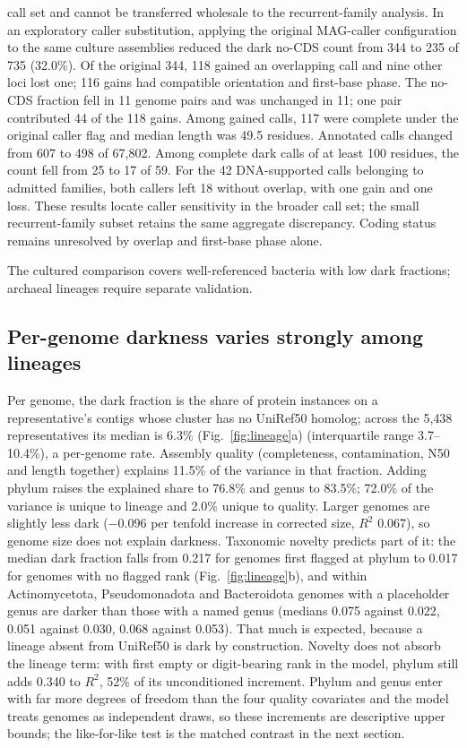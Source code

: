 \documentclass[11pt]{article}
\begin{document}
call set and cannot be transferred wholesale to the recurrent-family analysis.
In an exploratory caller substitution, applying the original MAG-caller configuration to the same culture assemblies reduced the dark no-CDS count from 344 to 235 of 735 (32.0\%). Of the original 344, 118 gained an overlapping call and nine other loci lost one; 116 gains had compatible orientation and first-base phase. The no-CDS fraction fell in 11 genome pairs and was unchanged in 11; one pair contributed 44 of the 118 gains. Among gained calls, 117 were complete under the original caller flag and median length was 49.5 residues. Annotated calls changed from 607 to 498 of 67{,}802. Among complete dark calls of at least 100 residues, the count fell from 25 to 17 of 59. For the 42 DNA-supported calls belonging to admitted families, both callers left 18 without overlap, with one gain and one loss. These results locate caller sensitivity in the broader call set; the small recurrent-family subset retains the same aggregate discrepancy. Coding status remains unresolved by overlap and first-base phase alone.

The cultured comparison covers well-referenced bacteria with low dark
fractions; archaeal lineages require separate validation.

\subsection*{Per-genome darkness varies strongly among lineages}

Per genome, the dark fraction is the share of protein instances on a representative's contigs whose
cluster has no UniRef50 homolog; across the 5{,}438 representatives its median is 6.3\% (Fig.~\ref{fig:lineage}a)
(interquartile range 3.7--10.4\%), a per-genome rate. Assembly quality (completeness, contamination, N50 and length together) explains 11.5\% of the
variance in that fraction. Adding phylum raises the explained share to 76.8\% and genus to 83.5\%;
72.0\% of the variance is unique to lineage and 2.0\% unique to quality.
Larger genomes are slightly less dark ($-0.096$ per tenfold increase in corrected size, $R^2$ 0.067),
so genome size does not explain darkness. Taxonomic novelty predicts part of it: the median dark
fraction falls from 0.217 for genomes first flagged at phylum to 0.017 for genomes with no flagged rank
(Fig.~\ref{fig:lineage}b), and within Actinomycetota, Pseudomonadota and Bacteroidota genomes with a
placeholder genus are darker than those with a named genus (medians 0.075 against 0.022, 0.051
against 0.030, 0.068 against 0.053). That much is expected, because a lineage absent from UniRef50
is dark by construction. Novelty does not absorb the lineage term: with first empty or digit-bearing rank in the
model, phylum still adds 0.340 to $R^2$, 52\% of its unconditioned increment. Phylum and genus enter
with far more degrees of freedom than the four quality covariates and the model treats genomes as
independent draws, so these increments are descriptive upper bounds; the like-for-like test is the
matched contrast in the next section.
\end{document}
